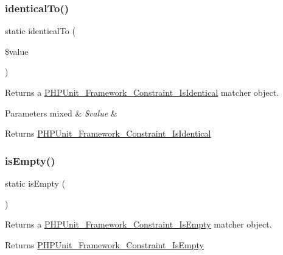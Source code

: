 \subsubsection{\texorpdfstring{identical\+To()}{identicalTo()}}
{\footnotesize\ttfamily static identical\+To (\begin{DoxyParamCaption}\item[{}]{\$value }\end{DoxyParamCaption})\hspace{0.3cm}{\ttfamily [static]}}

Returns a \mbox{\hyperlink{class_p_h_p_unit___framework___constraint___is_identical}{P\+H\+P\+Unit\+\_\+\+Framework\+\_\+\+Constraint\+\_\+\+Is\+Identical}} matcher object.


\begin{DoxyParams}[1]{Parameters}
mixed & {\em \$value} & \\
\hline
\end{DoxyParams}
\begin{DoxyReturn}{Returns}
\mbox{\hyperlink{class_p_h_p_unit___framework___constraint___is_identical}{P\+H\+P\+Unit\+\_\+\+Framework\+\_\+\+Constraint\+\_\+\+Is\+Identical}} 
\end{DoxyReturn}
\mbox{\label{class_p_h_p_unit___framework___assert_aa4780c055395206e57fb4ec8aa33ce52}} 
\subsubsection{\texorpdfstring{is\+Empty()}{isEmpty()}}
{\footnotesize\ttfamily static is\+Empty (\begin{DoxyParamCaption}{ }\end{DoxyParamCaption})\hspace{0.3cm}{\ttfamily [static]}}

Returns a \mbox{\hyperlink{class_p_h_p_unit___framework___constraint___is_empty}{P\+H\+P\+Unit\+\_\+\+Framework\+\_\+\+Constraint\+\_\+\+Is\+Empty}} matcher object.

\begin{DoxyReturn}{Returns}
\mbox{\hyperlink{class_p_h_p_unit___framework___constraint___is_empty}{P\+H\+P\+Unit\+\_\+\+Framework\+\_\+\+Constraint\+\_\+\+Is\+Empty}} 
\end{DoxyReturn}
\mbox{\label{class_p_h_p_unit___framework___assert_ad9c918506615e9b2507e0bc9d70add8b}} 
